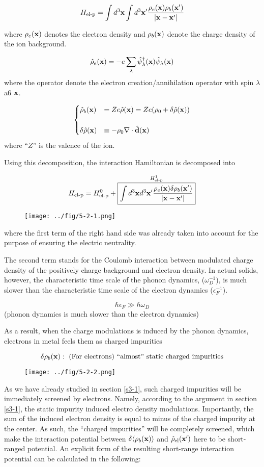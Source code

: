 \[H_{\text{el-p}}=\int d^3{\bf x}\int d^3{\bf x'}\frac{\rho_e({\bf x})\rho_b({\bf x'})}{|\bf x-x'|} \]

where $\rho_e({\bf x})$ denotes the electron density and $\rho_b({\bf x})$ denote the charge density of the ion background.

\[\hat{\rho}_e({\bf x}) = -e\sum_\lambda\hat{\psi}_\lambda^\dagger({\bf x})\hat{\psi}_\lambda({\bf x}) \]
where the operator denote the electron creation/annihilation operator with spin $\lambda$ a6 $\bf x$.

\[\begin{cases}
\hat{\rho}_b({\bf x}) &= Ze\hat{\rho}({\bf x}) = Ze(\rho_0+\delta\hat{\rho}({\bf x}))\\
&\\
\delta\hat{\rho}({\bf x}) &\equiv-\rho_0\nabla\cdot\hat{\bf d}({\bf x})
\end{cases}\]
where ``$Z$'' is the valence of the ion.

Using this decomposition, the interaction Hamiltonian is decomposed into

\[H_{\text{el-p}} = H_{\text{el-p}}^0 + \overset{H_{\text{el-p}}^1}{\fbox{$\displaystyle\int d^3{\bf x}d^3{\bf x'}\displaystyle\frac{\rho_e({\bf x})\delta\rho_b({\bf x'})}{|\bf x-x'|}$}} \]
\begin{wrapfigure}{r}{6cm}
\texttt{[image: ../fig/5-2-1.png]}
\end{wrapfigure}
where the first term of the right hand side was already taken into account for the purpose of ensuring the electric neutrality.

The second term stands for the Coulomb interaction between modulated charge density of the positively charge background and electron density. In actual solids, however, the characteristic time scale of the phonon dynamics, ($\omega_D^{-1}$), is much slower than the characteristic time scale of the electron dynamics ($\epsilon_F^{-1}$).

\[\hbar\epsilon_F\gg\hbar\omega_D \]
(phonon dynamics is much slower than the electron dynamics)

As a result, when the charge modulations is induced by the phonon dynamics, electrons in metal feels them as  charged impurities

\[\delta\rho_b({\bf x}):\text{ (For electrons) ``almost'' static charged impurities} \]
\begin{wrapfigure}{r}{6cm}
\texttt{[image: ../fig/5-2-2.png]}
\end{wrapfigure}
As we have already studied in section \ref{s3-1}, such charged impurities will be immediately screened by electrons. Namely, according to the argument in section \ref{s3-1}, the static impurity induced electro density modulations. Importantly, the sum of the induced electron density is equal to minus of the charged impurity at the center. As such, the ``charged impurities'' will be completely screened, which make the interaction potential between $\delta\langle\rho_b(\bf x)\rangle$ and $\hat{\rho}_{\text{el}}(\bf x')$ here to be short-ranged potential. An explicit form of the resulting short-range interaction potential can be calculated in the following:

